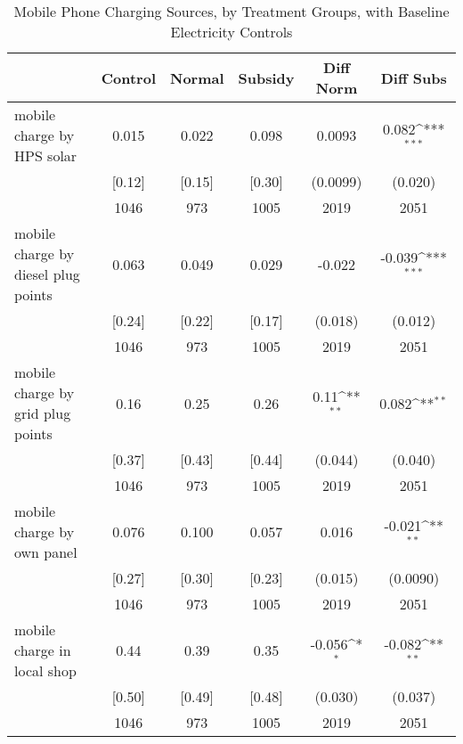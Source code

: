 \begin{table}[htbp]\centering
\def\sym#1{\ifmmode^{#1}\else\(^{#1}\)\fi}
\caption{Mobile Phone Charging Sources, by Treatment Groups, with Baseline Electricity Controls \label{tab:"balance"}}
\begin{tabular*}{0.9\hsize}{@{\hskip\tabcolsep\extracolsep\fill}l*{1}{ccccc}}
\toprule
                                &  Control&   Normal&  Subsidy&Diff Norm         &Diff Subs         \\
\midrule
mobile charge by HPS solar      &    0.015&    0.022&    0.098&   0.0093         &    0.082\sym{***}\\
                                &   [0.12]&   [0.15]&   [0.30]& (0.0099)         &  (0.020)         \\
                                &     1046&      973&     1005&     2019         &     2051         \\
mobile charge by diesel  plug points&    0.063&    0.049&    0.029&   -0.022         &   -0.039\sym{***}\\
                                &   [0.24]&   [0.22]&   [0.17]&  (0.018)         &  (0.012)         \\
                                &     1046&      973&     1005&     2019         &     2051         \\
mobile charge by grid plug points&     0.16&     0.25&     0.26&     0.11\sym{**} &    0.082\sym{**} \\
                                &   [0.37]&   [0.43]&   [0.44]&  (0.044)         &  (0.040)         \\
                                &     1046&      973&     1005&     2019         &     2051         \\
mobile charge by own panel      &    0.076&    0.100&    0.057&    0.016         &   -0.021\sym{**} \\
                                &   [0.27]&   [0.30]&   [0.23]&  (0.015)         & (0.0090)         \\
                                &     1046&      973&     1005&     2019         &     2051         \\
mobile charge in local shop     &     0.44&     0.39&     0.35&   -0.056\sym{*}  &   -0.082\sym{**} \\
                                &   [0.50]&   [0.49]&   [0.48]&  (0.030)         &  (0.037)         \\
                                &     1046&      973&     1005&     2019         &     2051         \\

\end{tabular*}
\end{table}
